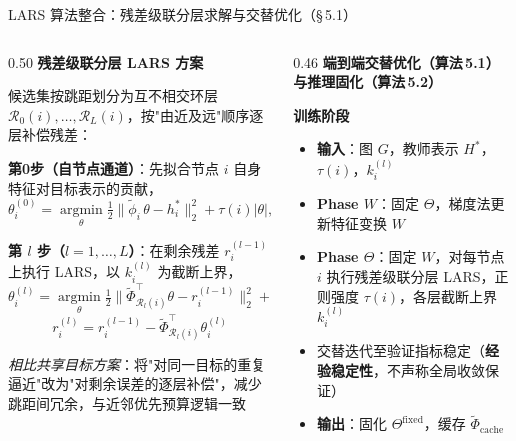 \documentclass[aspectratio=169,9pt,xcolor=dvipsnames]{beamer}
\newcommand{\blue}[1]{\textcolor{mynavy}{#1}}
\begin{document}
\begin{frame}{LARS 算法整合：残差级联分层求解与交替优化（§\,5.1）}
\begin{columns}[T]
\begin{column}{0.50\textwidth}
  \textbf{\blue{残差级联分层 LARS 方案}}

  候选集按跳距划分为互不相交环层 $\mathcal{R}_0(i),\ldots,\mathcal{R}_L(i)$，按"由近及远"顺序逐层补偿残差：

  \smallskip
  \textbf{第0步（自节点通道）}：先拟合节点 $i$ 自身特征对目标表示的贡献，
  \begin{equation*}
    \theta_i^{(0)} = \operatorname*{argmin}_{\theta}
    \tfrac{1}{2}\|\tilde{\phi}_i\,\theta - h_i^*\|_2^2 + \tau(i)|\theta|,
    \quad r_i^{(0)} = h_i^* - \tilde{\phi}_i\,\theta_i^{(0)}
  \end{equation*}

  \textbf{第 $l$ 步（$l=1,\ldots,L$）}：在剩余残差 $r_i^{(l-1)}$ 上执行 LARS，以 $k_i^{(l)}$ 为截断上界，
  \begin{equation*}
    \theta_i^{(l)} = \operatorname*{argmin}_{\theta}
    \tfrac{1}{2}\bigl\|\tilde{\Phi}_{\mathcal{R}_l(i)}^\top\theta - r_i^{(l-1)}\bigr\|_2^2
    + \tau(i)\|\theta\|_1
  \end{equation*}
  \begin{equation*}
    r_i^{(l)} = r_i^{(l-1)} - \tilde{\Phi}_{\mathcal{R}_l(i)}^\top\theta_i^{(l)}
  \end{equation*}

  \smallskip
  \textit{相比共享目标方案}：将"对同一目标的重复逼近"改为"对剩余误差的逐层补偿"，减少跳距间冗余，与近邻优先预算逻辑一致
\end{column}

\begin{column}{0.46\textwidth}
  \textbf{\blue{端到端交替优化（算法\,5.1）与推理固化（算法\,5.2）}}

  \smallskip
  \textbf{训练阶段}
  \begin{itemize}\small\setlength{\itemsep}{2pt}
    \item \textbf{输入}：图 $G$，教师表示 $H^*$，$\tau(i)$，$k_i^{(l)}$
    \item \textbf{Phase $W$}：固定 $\Theta$，梯度法更新特征变换 $W$
    \item \textbf{Phase $\Theta$}：固定 $W$，对每节点 $i$ 执行残差级联分层 LARS，正则强度 $\tau(i)$，各层截断上界 $k_i^{(l)}$
    \item 交替迭代至验证指标稳定（\textbf{经验稳定性}，不声称全局收敛保证）
    \item \textbf{输出}：固化 $\Theta^{\mathrm{fixed}}$，缓存 $\tilde{\Phi}_{\mathrm{cache}}$
  \end{itemize}


\end{column}
\end{columns}
\end{frame}
\end{document}

